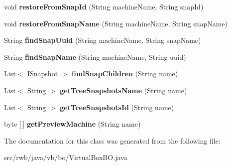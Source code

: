 \begin{DoxyCompactItemize}
void {\bfseries restore\+From\+Snap\+Id} (String machine\+Name, String snap\+Id)
\item 
\mbox{\label{classrwb_1_1java_1_1vb_1_1bo_1_1_virtual_box_b_o_a8f29f5e09e741ebb9642f08315042b7c}} 
void {\bfseries restore\+From\+Snap\+Name} (String machine\+Name, String snap\+Name)
\item 
\mbox{\label{classrwb_1_1java_1_1vb_1_1bo_1_1_virtual_box_b_o_a649aa53a71e951758700dd6925d72d61}} 
String {\bfseries find\+Snap\+Uuid} (String machine\+Name, String snap\+Name)
\item 
\mbox{\label{classrwb_1_1java_1_1vb_1_1bo_1_1_virtual_box_b_o_af4f7bdf1ba5b7c4894892ffe39d7b363}} 
String {\bfseries find\+Snap\+Name} (String machine\+Name, String uuid)
\item 
\mbox{\label{classrwb_1_1java_1_1vb_1_1bo_1_1_virtual_box_b_o_a7ae0cdc7c7968168b6697b716bbfff3c}} 
List$<$ I\+Snapshot $>$ {\bfseries find\+Snap\+Children} (String name)
\item 
\mbox{\label{classrwb_1_1java_1_1vb_1_1bo_1_1_virtual_box_b_o_a6a522e853137d7f3533aea5aafb275ee}} 
List$<$ String $>$ {\bfseries get\+Tree\+Snapshots\+Name} (String name)
\item 
\mbox{\label{classrwb_1_1java_1_1vb_1_1bo_1_1_virtual_box_b_o_aa9b67c641bc15c9830cab2a8f9e3d6b9}} 
List$<$ String $>$ {\bfseries get\+Tree\+Snapshots\+Id} (String name)
\item 
\mbox{\label{classrwb_1_1java_1_1vb_1_1bo_1_1_virtual_box_b_o_afd87b2c8f071cda763caad78c8430faf}} 
byte \mbox{[}$\,$\mbox{]} {\bfseries get\+Preview\+Machine} (String name)
\end{DoxyCompactItemize}


The documentation for this class was generated from the following file\+:\begin{DoxyCompactItemize}
\item 
src/rwb/java/vb/bo/Virtual\+Box\+B\+O.\+java\end{DoxyCompactItemize}
